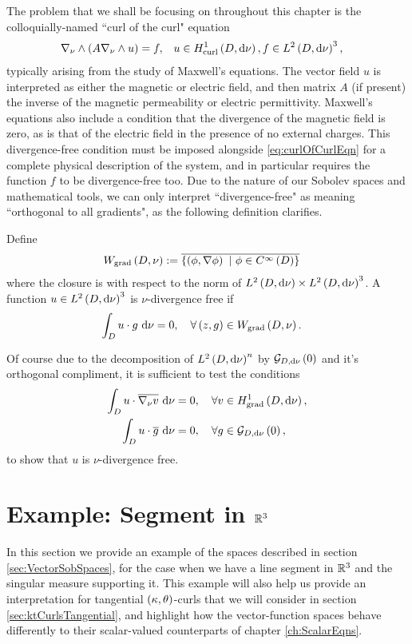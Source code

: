 The problem that we shall be focusing on throughout this chapter is the colloquially-named ``curl of the curl" equation 
\begin{align} \label{eq:curlOfCurlEqn}
	\nabla_{\nu}\wedge\left( A\nabla_{\nu}\wedge u \right) = f, &\quad u\in H^1_\mathrm{curl}\left( D, \mathrm{d}\nu \right), f\in L^{2}\left( D,\mathrm{d}\nu \right)^3,
\end{align}
typically arising from the study of Maxwell's equations.
The vector field $u$ is interpreted as either the magnetic or electric field, and then matrix $A$ (if present) the inverse of the magnetic permeability or electric permittivity.
Maxwell's equations also include a condition that the divergence of the magnetic field is zero, as is that of the electric field in the presence of no external charges.
This divergence-free condition must be imposed alongside \eqref{eq:curlOfCurlEqn} for a complete physical description of the system, and in particular requires the function $f$ to be divergence-free too.
Due to the nature of our Sobolev spaces and mathematical tools, we can only interpret ``divergence-free" as meaning ``orthogonal to all gradients", as the following definition clarifies.
\begin{definition}
	Define 
	\begin{align*}
		W_{\mathrm{grad}}\left( D,\nu \right) &:= \overline{\left\{  \left( \phi, \nabla\phi \right) \ \vert \ \phi\in C^{\infty}\left( D \right)  \right\}}
	\end{align*}
	where the closure is with respect to the norm of $L^{2}\left( D,\mathrm{d}\nu \right)\times L^{2}\left( D,\mathrm{d}\nu \right)^3$.
	A function $u\in L^{2}\left( D,\mathrm{d}\nu \right)^3$ is $\nu$-divergence free if
	\begin{align*}
		\int_{D} u\cdot g  \ \mathrm{d}\nu &= 0, \quad \forall \left( z,g \right)\in W_{\mathrm{grad}}\left( D,\nu \right).
	\end{align*}	 
\end{definition}

Of course due to the decomposition of $L^{2}\left( D,\mathrm{d}\nu \right)^n$ by $\mathcal{G}_{ D, \mathrm{d}\nu}\left( 0 \right)$ and it's orthogonal compliment, it is sufficient to test the conditions
\begin{align*}
	\int_{D} u\cdot\overline{\nabla_{\nu}v}  \ \mathrm{d}\nu &= 0, \quad \forall v\in H^1_\mathrm{grad}\left( D, \mathrm{d}\nu \right), \\
	\int_{D} u\cdot\overline{g}  \ \mathrm{d}\nu &= 0, \quad \forall g\in\mathcal{G}_{ D, \mathrm{d}\nu}\left( 0 \right),
\end{align*}
to show that $u$ is $\nu$-divergence free.

\section{Example: Segment in $\mathbb{R}^3$} \label{sec:CurlExamples}
In this section we provide an example of the spaces described in section \ref{sec:VectorSobSpaces}, for the case when we have a line segment in $\mathbb{R}^3$ and the singular measure supporting it. 
This example will also help us provide an interpretation for tangential $\left( \kappa, \theta \right)$-curls that we will consider in section \ref{sec:ktCurlsTangential}, and highlight how the vector-function spaces behave differently to their scalar-valued counterparts of chapter \ref{ch:ScalarEqns}. \newline

